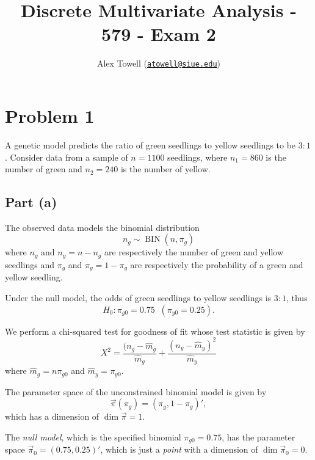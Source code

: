 \documentclass[
]{article}
\title{Discrete Multivariate Analysis - 579 - Exam 2}
\author{Alex Towell
(\href{mailto:atowell@siue.edu}{\nolinkurl{atowell@siue.edu}})}
\date{}
\begin{document}
\maketitle

\newcommand{\var}{\operatorname{Var}}
\newcommand{\expect}{\operatorname{E}}
\newcommand{\corr}{\operatorname{Corr}}
\newcommand{\cov}{\operatorname{Cov}}
\newcommand{\ssr}{\operatorname{SSR}}
\newcommand{\se}{\operatorname{SE}}
\newcommand{\mat}[1]{\mathbf{#1}}
\newcommand{\RR}{\operatorname{RR}}
\newcommand{\eval}[2]{\left. #1 \right\vert_{#2}}

\hypertarget{problem-1}{%
\section{Problem 1}\label{problem-1}}

A genetic model predicts the ratio of green seedlings to yellow
seedlings to be \(3:1\). Consider data from a sample of \(n=1100\)
seedlings, where \(n_1 = 860\) is the number of green and \(n_2 = 240\)
is the number of yellow.

\hypertarget{part-a}{%
\subsection{Part (a)}\label{part-a}}


The observed data models the binomial distribution \[
  n_g \sim \operatorname{BIN}(n, \pi_g)
\] where \(n_g\) and \(n_y = n - n_g\) are respectively the number of
green and yellow seedlings and \(\pi_g\) and \(\pi_y=1-\pi_g\) are
respectively the probability of a green and yellow seedling.

Under the null model, the odds of green seedlings to yellow seedlings is
\(3:1\), thus \[
  H_0 : \pi_{g 0} = 0.75 \;\; (\pi_{y 0} = 0.25).
\]

We perform a chi-squared test for goodness of fit whose test statistic
is given by \[
  X^2 = \frac{(n_g - \hat{m}_g}{\hat{m}_g} + \frac{(n_y - \hat{m}_y)^2}{\hat{m}_y}
\] where \(\hat{m}_g = n \pi_{g 0}\) and \(\hat{m}_y = \pi_{y 0}\).

The parameter space of the unconstrained binomial model is given by \[
  \vec{\pi}(\pi_g) = (\pi_g, 1-\pi_g)',
\] which has a dimension of \(\dim \vec{\pi} = 1\).

The \emph{null model}, which is the specified binomial
\(\pi_{g 0} = 0.75\), has the parameter space
\(\vec{\pi}_0 = (0.75,0.25)'\), which is just a \emph{point} with a
dimension of \(\dim \vec{\pi}_0 = 0\).
\end{document}

